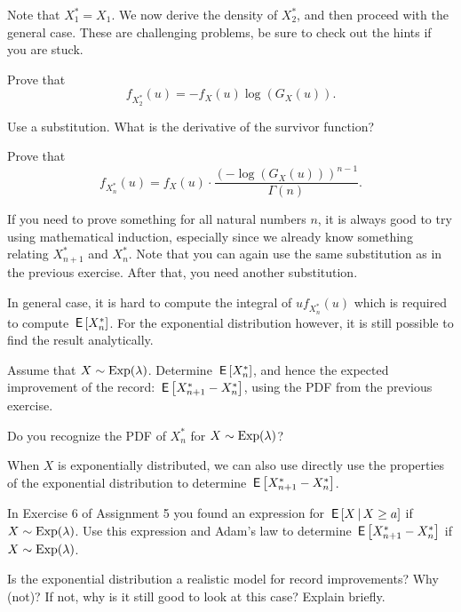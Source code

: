 Note that $X_1^* = X_1$. We now derive the density of $X_2^*$, and then proceed with the general case. These are challenging problems, be sure to check out the hints if you are stuck.

\begin{exercise}
Prove that $$f_{X_2^*}(u) = - f_X(u) \log(G_X(u)).$$
\begin{hint}
Use a substitution. What is the derivative of the survivor function?
\end{hint}
\end{exercise}

\begin{exercise}
Prove that $$f_{X_n^*}(u) = f_X(u) \cdot \frac{(-\log(G_X(u)))^{n-1}}{\Gamma(n)}.$$
\begin{hint}
If you need to prove something for all natural numbers $n$, it is always good to try using mathematical induction, especially since we already know something relating $X_{n+1}^*$ and $X_n^*$.
Note that you can again use the same substitution as in the previous exercise. After that, you need another substitution.
\end{hint}
\end{exercise}

In general case, it is hard to compute the integral of $u f_{X_n^*}(u)$ which is required to compute $\,\mathsf{E}\left[X_n^*\right]$.
For the exponential distribution however, it is still possible to find the result analytically.

\begin{exercise}
Assume that $X \sim \mathrm{Exp}(\lambda)$. Determine $\,\mathsf{E}\left[X_n^*\right]$, and hence the expected improvement of the record: $\,\mathsf{E}\left[X_{n+1}^* - X_n^*\right]$, using the PDF from the previous exercise.
\begin{hint}
Do you recognize the PDF of $X_n^*$ for $X \sim \mathrm{Exp}(\lambda)$?
\end{hint}
\end{exercise}


When $X$ is exponentially distributed, we can also use directly use the properties of the exponential distribution to determine  $\,\mathsf{E}\left[X_{n+1}^* - X_n^*\right]$.

\begin{exercise}
In Exercise 6 of Assignment 5 you found an expression for $\,\mathsf{E}\left[X \,\middle|\, X \geq a\right]$ if $X \sim \mathrm{Exp}(\lambda)$. Use this expression and Adam's law to determine  $\,\mathsf{E}\left[X_{n+1}^* - X_n^*\right]$  if $X \sim \mathrm{Exp}(\lambda)$.
\end{exercise}

\begin{exercise}
Is the exponential distribution a realistic model for record improvements? Why (not)? If not, why is it still good to look at this case? Explain briefly.
\end{exercise}

